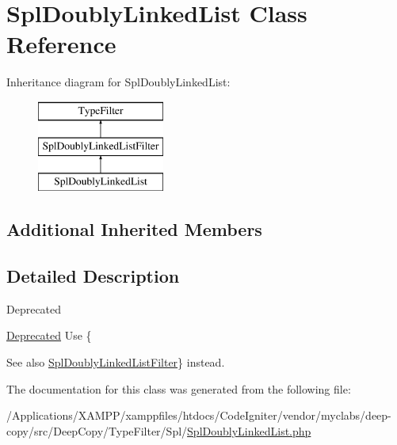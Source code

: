 \hypertarget{class_deep_copy_1_1_type_filter_1_1_spl_1_1_spl_doubly_linked_list}{}\section{Spl\+Doubly\+Linked\+List Class Reference}
\label{class_deep_copy_1_1_type_filter_1_1_spl_1_1_spl_doubly_linked_list}
Inheritance diagram for Spl\+Doubly\+Linked\+List\+:\begin{figure}[H]
\begin{center}
\leavevmode
\includegraphics[height=3.000000cm]{class_deep_copy_1_1_type_filter_1_1_spl_1_1_spl_doubly_linked_list}
\end{center}
\end{figure}
\subsection*{Additional Inherited Members}


\subsection{Detailed Description}
\begin{DoxyRefDesc}{Deprecated}
\item[\mbox{\hyperlink{deprecated__deprecated000022}{Deprecated}}]Use \{\end{DoxyRefDesc}
\begin{DoxySeeAlso}{See also}
\mbox{\hyperlink{class_deep_copy_1_1_type_filter_1_1_spl_1_1_spl_doubly_linked_list_filter}{Spl\+Doubly\+Linked\+List\+Filter}}\} instead. 
\end{DoxySeeAlso}


The documentation for this class was generated from the following file\+:\begin{DoxyCompactItemize}
\item 
/\+Applications/\+X\+A\+M\+P\+P/xamppfiles/htdocs/\+Code\+Igniter/vendor/myclabs/deep-\/copy/src/\+Deep\+Copy/\+Type\+Filter/\+Spl/\mbox{\hyperlink{_spl_doubly_linked_list_8php}{Spl\+Doubly\+Linked\+List.\+php}}\end{DoxyCompactItemize}
